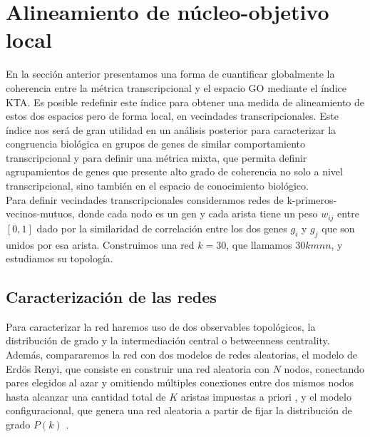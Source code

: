 \section{Alineamiento de núcleo-objetivo local}
En la sección anterior presentamos una forma de cuantificar globalmente la coherencia entre la métrica transcripcional y el espacio GO mediante el índice KTA. Es posible redefinir este índice para obtener una medida de alineamiento de estos dos espacios pero de forma local, en vecindades transcripcionales. Este índice nos será de gran utilidad en un análisis posterior para caracterizar la congruencia biológica en grupos de genes de similar comportamiento transcripcional y para definir una métrica mixta, que permita definir agrupamientos de genes que presente alto grado de coherencia no solo a nivel transcripcional, sino también en el espacio de conocimiento biológico.\\
Para definir vecindades transcripcionales consideramos redes de k-primeros-vecinos-mutuos, donde cada nodo es un gen y cada arista tiene un peso $w_{ij}$ entre $[0, 1]$ dado por la similaridad de correlación entre los dos genes $g_i$ y $g_j$ que son unidos por esa arista. Construimos una red $k=30$, que llamamos $30kmnn$, y estudiamos su topología.\\
\subsection{Caracterización de las redes}
Para caracterizar la red haremos uso de dos observables topológicos, la distribución de grado y la intermediación central o betweenness centrality.\\
Además, compararemos la red con dos modelos de redes aleatorias, el modelo de Erdös Renyi, que consiste en construir una red aleatoria con $N$ nodos, conectando pares elegidos al azar y omitiendo múltiples conexiones entre dos mismos nodos hasta alcanzar una cantidad total de $K$ aristas impuestas a priori \cite{Erdos1959}, y el modelo configuracional, que genera una red aleatoria a partir de fijar la distribución de grado $P(k)$ \cite{Molloy1995}.
